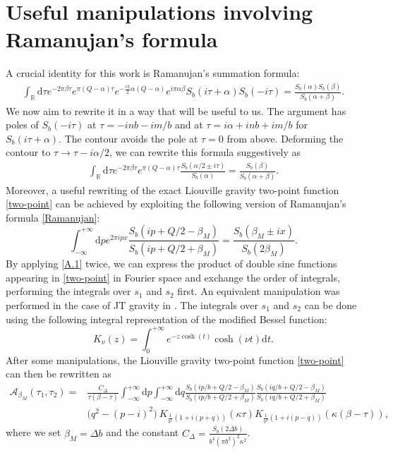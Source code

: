 \documentclass[a4paper,titlepage,12pt]{article}
\numberwithin{equation}{section}
\begin{document}
\section{Useful manipulations involving Ramanujan's formula}
\label{app:form}
A crucial identity for this work is Ramanujan's summation formula:
\begin{align}\label{master}
\int_\mathbb{R} \mathrm{d} \tau e^{-2\pi \beta \tau} e^{\pi (Q-\alpha)\tau} e^{-\frac{i \pi}{2}\alpha(Q-\alpha)}e^{i\pi \alpha\beta} S_b(i\tau+\alpha)S_b(-i\tau) = \frac{S_b(\alpha)S_b(\beta)}{S_b(\alpha+\beta)}.
\end{align}
We now aim to rewrite it in a way that will be useful to us. 
The argument has poles of $S_b(-i\tau)$ at $\tau=-inb-im/b$ and at $\tau=i\alpha+inb+im/b$ for $S_b(i\tau+\alpha)$. The contour avoids the pole at $\tau=0$ from above. Deforming the contour to $\tau \to \tau - i \alpha/2$, we can rewrite this formula suggestively as
\begin{align}\label{Ramanujan}
\int_\mathbb{R} \mathrm{d}\tau e^{-2\pi \beta \tau} e^{\pi (Q-\alpha)\tau} \frac{S_b(\alpha/2 \pm i \tau)}{S_b(\alpha)}= \frac{S_b(\beta)}{S_b(\alpha+\beta)}.
\end{align}
Moreover, a useful rewriting of the exact Liouville gravity two-point function \eqref{two-point} can be achieved by exploiting the following version of Ramanujan's formula \eqref{Ramanujan}:
\begin{equation}\label{A.1}
\int_{-\infty}^{+\infty} \mathrm{d} p e^{2\pi ip x}  \frac{S_b(ip+Q/2-\beta_M)}{S_b(ip+Q/2+\beta_M)}= \frac{S_b(\beta_M \pm i x)}{S_b(2 \beta_M)}.
\end{equation}
By applying \eqref{A.1} twice, we can express the product of double sine functions appearing in \eqref{two-point} in Fourier space and exchange the order of integrals, performing the integrals over $s_1$ and $s_2$ first. An equivalent manipulation was performed in the case of JT gravity in \cite{Griguolo:2021zsn}. The integrals over $s_1$ and $s_2$ can be done using the following integral representation of the modified Bessel function:
\begin{equation}
K_{\nu}(z)=\int_{0}^{+\infty} e^{-z \cosh(t)} \cosh(\nu t) \mathrm{d}t.
\end{equation}
After some manipulations, the Liouville gravity two-point function \eqref{two-point} can then be rewritten as 
\begin{equation}\label{A.3}
\begin{split}
\mathcal{A}_{\beta_M}(\tau_1,\tau_2)=&\frac{C_{\Delta}}{\tau(\beta-\tau)}\int_{-\infty}^{+\infty}\mathrm{d}p \int_{-\infty}^{+\infty}\mathrm{d}q \frac{S_b(ip/b+Q/2-\beta_M)}{S_b(ip/b+Q/2+\beta_M)} \frac{S_b(iq/b+Q/2-\beta_M)}{S_b(iq/b+Q/2+\beta_M)}\\
&\bigg(q^2-\left(p-i\right)^2\bigg) \ K_{\frac{1}{b^2}\left(1+i(p+q)\right)}(\kappa \tau)K_{\frac{1}{b^2}\left(1+i(p-q)\right)}(\kappa (\beta-\tau)),
\end{split}
\end{equation}
where we set $\beta_M=\Delta b$ and the constant $C_{\Delta}=\frac{ S_b(2 \Delta b)}{b^4 (\pi b^2)^2 \kappa^2 }$.
\end{document}
